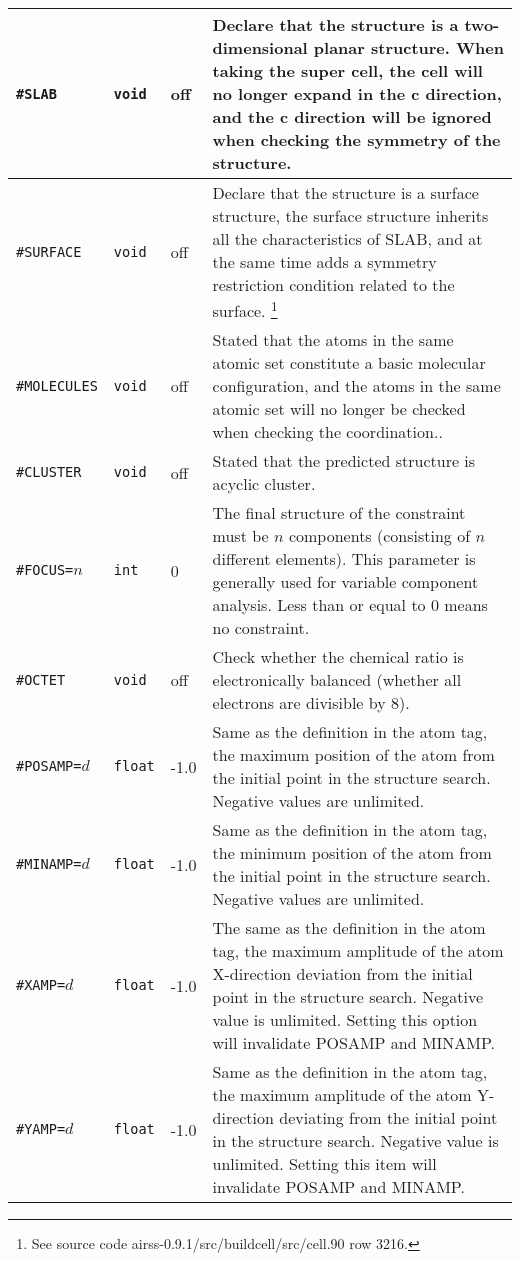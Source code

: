\documentclass[a4paper, 10pt]{article}
\begin{document}
\begin{center}
\begin{longtable}{m{11em}|m{4em}<{\centering}|m{3em}<{\centering}|m{15em}}
\midrule
\verb|#SLAB| & \verb|void| & off & Declare that the structure is a two-dimensional planar structure. When taking the super cell, the cell will no longer expand in the c direction, and the c direction will be ignored when checking the symmetry of the structure.\\
\midrule
\verb|#SURFACE| & \verb|void| & off & Declare that the structure is a surface structure, the surface structure inherits all the characteristics of SLAB, and at the same time adds a symmetry restriction condition related to the surface. \footnote{See source code airss-0.9.1/src/buildcell/src/cell.90 row 3216.}\\
\midrule
\verb|#MOLECULES|& \verb|void| & off & Stated that the atoms in the same atomic set constitute a basic molecular configuration, and the atoms in the same atomic set will no longer be checked when checking the coordination..\\
\midrule
\verb|#CLUSTER| & \verb|void| & off & Stated that the predicted structure is acyclic cluster.\\
\midrule
\verb|#FOCUS=|\(n\) & \verb|int| & 0 & The final structure of the constraint must be \(n\) components (consisting of \(n\) different elements). This parameter is generally used for variable component analysis. Less than or equal to 0 means no constraint.\\
\midrule
\verb|#OCTET|& \verb|void| & off & Check whether the chemical ratio is electronically balanced (whether all electrons are divisible by 8).\\
\midrule
\verb|#POSAMP=|\(d\) & \verb|float|  & -1.0 & Same as the definition in the atom tag, the maximum position of the atom from the initial point in the structure search. Negative values are unlimited.\\
\midrule
\verb|#MINAMP=|\(d\) & \verb|float| & -1.0 & Same as the definition in the atom tag, the minimum position of the atom from the initial point in the structure search. Negative values are unlimited.\\
\midrule
\verb|#XAMP=|\(d\) & \verb|float| & -1.0 & The same as the definition in the atom tag, the maximum amplitude of the atom X-direction deviation from the initial point in the structure search. Negative value is unlimited. Setting this option will invalidate POSAMP and MINAMP. \\
\midrule
\verb|#YAMP=|\(d\) & \verb|float| & -1.0 & Same as the definition in the atom tag, the maximum amplitude of the atom Y-direction deviating from the initial point in the structure search. Negative value is unlimited. Setting this item will invalidate POSAMP and MINAMP.\\

\end{longtable}
\end{center}
\end{document}
